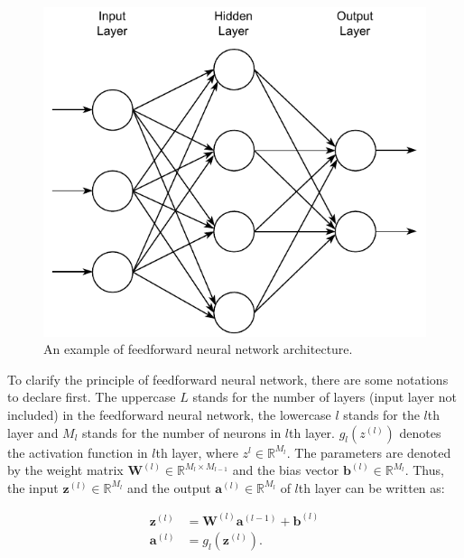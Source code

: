 \documentclass[
	parskip, 			   %
	twoside, 			   %
	DIV=14, 			   %
	BCOR=15.0mm, 		   %
	headsepline, 		   %
	open=right, 		   %
	captions=tableheading, %
	bibliography=totoc,    %
	numbers=noenddot       %
]{scrreprt}
\begin{document}
\clearpage
\begin{figure}[h!]
    \centering
    \includegraphics[scale=1]{figures/feedforward_neural_network.pdf}
    \caption{An example of feedforward neural network architecture.}
    \label{fig:feedforward}
\end{figure}

To clarify the principle of feedforward neural network, there are some notations to declare first. The uppercase $L$ stands for the number of layers (input layer not included) in the feedforward neural network, the lowercase $l$ stands for the $l$th layer and $M_{l}$ stands for the number of neurons in $l$th layer. $g_{l}(z^{(l)})$ denotes the activation function in $l$th layer, where $z^{l} \in \mathbb{R}^{M_{l}}$. The parameters are denoted by the weight matrix $\mathbf{W}^{(l)} \in \mathbb{R}^{M_{l} \times M_{l-1}}$ and the bias vector $\mathbf{b}^{(l)} \in \mathbb{R}^{M_{l}}$. Thus, the input $\mathbf{z}^{(l)} \in \mathbb{R}^{M_{l}}$ and the output $\mathbf{a}^{(l)} \in \mathbb{R}^{M_{l}}$ of $l$th layer can be written as:

\begin{equation}
    \label{eq:input_output_neuron}
    \begin{aligned}
    \mathbf{z}^{(l)} &= \mathbf{W}^{(l)} \mathbf{a}^{(l-1)} + \mathbf{b}^{(l)}\\
    \mathbf{a}^{(l)} &= g_{l}(\mathbf{z}^{(l)}).
    \end{aligned}
\end{equation}
\end{document}
